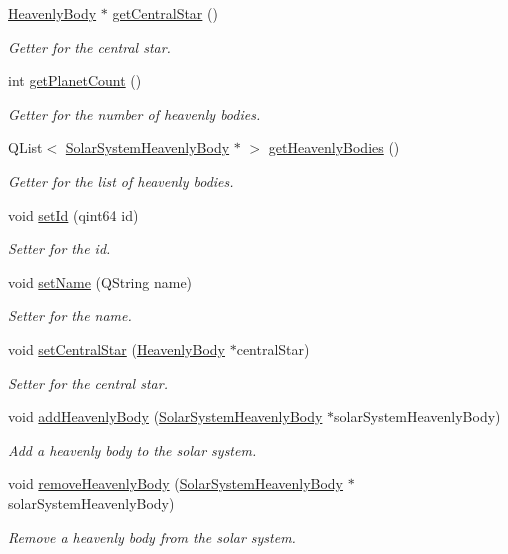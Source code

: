 \begin{DoxyCompactItemize}
\hyperlink{classHeavenlyBody}{\-Heavenly\-Body} $\ast$ \hyperlink{classSolarSystem_a90d1c7f9e05a1bd528b62056b27ff424}{get\-Central\-Star} ()
\begin{DoxyCompactList}\small\item\em \-Getter for the central star. \end{DoxyCompactList}\item 
int \hyperlink{classSolarSystem_a2b6d483d05a984f94c2916f41d812f4b}{get\-Planet\-Count} ()
\begin{DoxyCompactList}\small\item\em \-Getter for the number of heavenly bodies. \end{DoxyCompactList}\item 
\-Q\-List$<$ \hyperlink{classSolarSystemHeavenlyBody}{\-Solar\-System\-Heavenly\-Body} $\ast$ $>$ \hyperlink{classSolarSystem_ad9adea29a8b57fe361591cafce61b0e2}{get\-Heavenly\-Bodies} ()
\begin{DoxyCompactList}\small\item\em \-Getter for the list of heavenly bodies. \end{DoxyCompactList}\item 
void \hyperlink{classSolarSystem_a97a3b70024c266b428cf4bea2ecdb45c}{set\-Id} (qint64 id)
\begin{DoxyCompactList}\small\item\em \-Setter for the id. \end{DoxyCompactList}\item 
void \hyperlink{classSolarSystem_a1642e94eaa54bc4e43471384f95dcc7d}{set\-Name} (\-Q\-String name)
\begin{DoxyCompactList}\small\item\em \-Setter for the name. \end{DoxyCompactList}\item 
void \hyperlink{classSolarSystem_a468b93dfe340aff47ae7a010020ca365}{set\-Central\-Star} (\hyperlink{classHeavenlyBody}{\-Heavenly\-Body} $\ast$central\-Star)
\begin{DoxyCompactList}\small\item\em \-Setter for the central star. \end{DoxyCompactList}\item 
void \hyperlink{classSolarSystem_abb8b63f463e770dcd596a5df020ec4be}{add\-Heavenly\-Body} (\hyperlink{classSolarSystemHeavenlyBody}{\-Solar\-System\-Heavenly\-Body} $\ast$solar\-System\-Heavenly\-Body)
\begin{DoxyCompactList}\small\item\em \-Add a heavenly body to the solar system. \end{DoxyCompactList}\item 
void \hyperlink{classSolarSystem_a20851d16c7fac4274206834c11746b13}{remove\-Heavenly\-Body} (\hyperlink{classSolarSystemHeavenlyBody}{\-Solar\-System\-Heavenly\-Body} $\ast$solar\-System\-Heavenly\-Body)
\begin{DoxyCompactList}\small\item\em \-Remove a heavenly body from the solar system. \end{DoxyCompactList}\end{DoxyCompactItemize}


